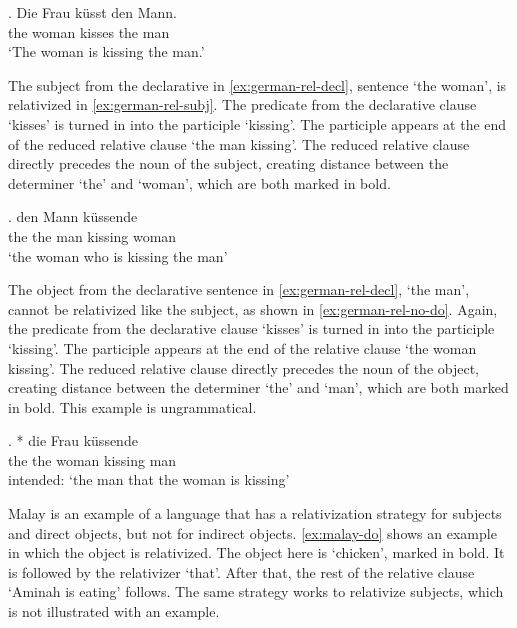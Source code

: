 \exg. Die Frau küsst den Mann.\\
the woman kisses the man\\
`The woman is kissing the man.' \label{ex:german-rel-decl}

The subject from the declarative in \ref{ex:german-rel-decl}, sentence  `the woman', is relativized in \ref{ex:german-rel-subj}. The predicate from the declarative clause  `kisses' is turned in into the participle  `kissing'. The participle appears at the end of the reduced relative clause  `the man kissing'. The reduced relative clause directly precedes the noun of the subject, creating distance between the determiner  `the' and  `woman', which are both marked in bold.

\exg.  den Mann küssende \\
 the the man kissing woman\\
 `the woman who is kissing the man' \label{ex:german-rel-subj}

The object from the declarative sentence in \ref{ex:german-rel-decl},  `the man', cannot be relativized like the subject, as shown in \ref{ex:german-rel-no-do}. Again, the predicate from the declarative clause  `kisses' is turned in into the participle  `kissing'. The participle appears at the end of the relative clause  `the woman kissing'. The reduced relative clause directly precedes the noun of the object, creating distance between the determiner  `the' and  `man', which are both marked in bold. This example is ungrammatical.

\exg. * die Frau küssende \\
 the the woman kissing man\\
 intended: `the man that the woman is kissing' \label{ex:german-rel-no-do}

Malay is an example of a language that has a relativization strategy for subjects and direct objects, but not for indirect objects. \ref{ex:malay-do} shows an example in which the object is relativized. The object here is  `chicken', marked in bold. It is followed by the relativizer  `that'. After that, the rest of the relative clause  `Aminah is eating' follows. The same strategy works to relativize subjects, which is not illustrated with an example.

